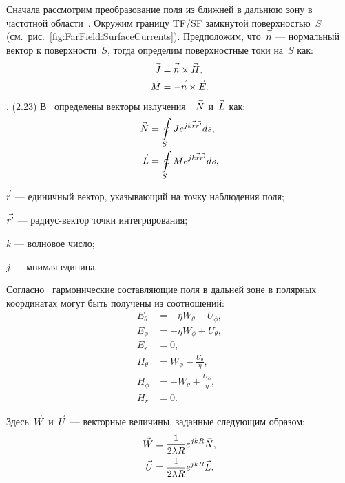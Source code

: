 Сначала рассмотрим преобразование поля из ближней в дальнюю зону в частотной
области~\cite{bib:Luebbers1991,bib:GodaraHandbook2002}. Окружим
границу TF/SF замкнутой поверхностью~$S$ (см.~рис.~\ref{fig:FarField:SurfaceCurrents}).
Предположим, что~$\vec{n\mathstrut}$ --- нормальный вектор к поверхности~$S$, тогда
определим поверхностные токи на~$S$ как:
\begin{align}
    \vec{J\mathstrut} &=   \vec{n\mathstrut} \times \vec{H\mathstrut}, \\
    \vec{M\mathstrut} &= - \vec{n\mathstrut} \times \vec{E\mathstrut}.
\end{align}
.								(2.23)
В~\cite{bib:Luebbers1991,bib:GodaraHandbook2002} определены векторы
излучения~~$\vec{N\mathstrut}$ и~$\vec{L\mathstrut}$ как:
\begin{align}
    \vec{N\mathstrut} &= \oint\limits_S J e^{jk\vec{r\mathstrut}\vec{r'\mathstrut}} ds, \\
    \vec{L\mathstrut} &= \oint\limits_S M e^{jk\vec{r\mathstrut}\vec{r'\mathstrut}} ds,
\end{align}
%
\begin{where}
\item $\vec{r\mathstrut}$  --- единичный вектор, указывающий на точку наблюдения поля;
\item $\vec{r'\mathstrut}$ --- радиус-вектор точки интегрирования;
\item $k$ --- волновое число;
\item $j$ --- мнимая единица.
\end{where}

Согласно~\cite{bib:Luebbers1991} гармонические составляющие поля в дальней зоне
в полярных координатах могут быть получены из соотношений:
\begin{align}
\label{eq:FarField:LuebbersEquations}
    E_\theta &= - \eta W_\theta - U_\phi, \\
    E_\phi   &= - \eta W_\phi   + U_\theta, \\
    E_r      &=   0, \\
    H_\theta &=   W_\phi - \frac{U_\theta}{\eta}, \\
    H_\phi   &= - W_\theta + \frac{U_\phi}{\eta}, \\
    H_r      &=   0.
\end{align}

Здесь~$\vec{W\mathstrut}$ и~$\vec{U\mathstrut}$ --- векторные величины, заданные следующим
образом:
\begin{align}
    \vec{W\mathstrut} &= \frac{1}{2\lambda R} e^{jkR} \vec{N\mathstrut}, \\
    \vec{U\mathstrut} &= \frac{1}{2\lambda R} e^{jkR} \vec{L\mathstrut}.
\end{align}

